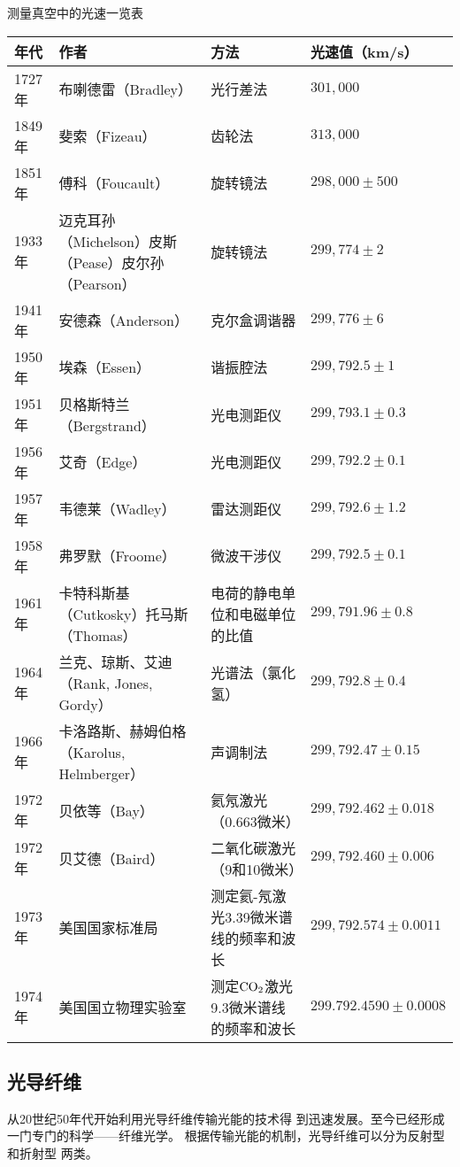 测量真空中的光速一览表
\begin{center}
    \begin{tabular}{lp{}p{}l}
\hline
年代&作者&方法&光速值（km/s）\\
\hline
1727年&布喇德雷（Bradley）&光行差法& $301,000$\\
1849年&斐索（Fizeau）&齿轮法& $313,000$\\
1851年&傅科（Foucault）&旋转镜法& $298,000\pm 500$\\
1933年&迈克耳孙（Michelson）皮斯（Pease）皮尔孙（Pearson）   &旋转镜法& $299,774\pm 2$\\
1941年&安德森（Anderson）&克尔盒调谐器&$299,776\pm 6$\\
1950年&埃森（Essen）&谐振腔法&$299,792.5\pm 1$\\
1951年&贝格斯特兰（Bergstrand）&光电测距仪&$299,793.1\pm 0.3$\\
1956年&艾奇（Edge）&光电测距仪&$299,792.2\pm 0.1$\\
1957年&韦德莱（Wadley）&雷达测距仪&$299,792.6\pm 1.2$\\
1958年&弗罗默（Froome）&微波干涉仪&$299,792.5\pm 0.1$\\
1961年&卡特科斯基（Cutkosky）托马斯（Thomas）&电荷的静电单位和电磁单位的比值&$299,791.96\pm 0.8$\\
1964年&
兰克、琼斯、艾迪（Rank, Jones, Gordy）&光谱法（氯化氢）&$299,792.8\pm 0.4$\\
1966年&卡洛路斯、赫姆伯格（Karolus, Helmberger）&声调制法&$299,792.47\pm 0.15$\\
1972年&贝依等（Bay）&氦氖激光（0.663微米）&$299,792.462\pm 0.018$\\
1972年&贝艾德（Baird）&二氧化碳激光（9和10微米）&$299,792.460\pm 0.006$\\
1973年&美国国家标准局&测定氦-氖激光3.39微米谱线的频率和波长&$299,792.574\pm 0.0011$\\
1974年&美国国立物理实验室&测定$\rm CO_2$激光9.3微米谱线的频率和波长&$299.792.4590\pm 0.0008$\\
\hline
    \end{tabular}
\end{center}


\subsection{光导纤维}

从20世纪50年代开始利用光导纤维传输光能的技术得
到迅速发展。至今已经形成一门专门的科学——纤维光学。
根据传输光能的机制，光导纤维可以分为反射型和折射型
两类。

